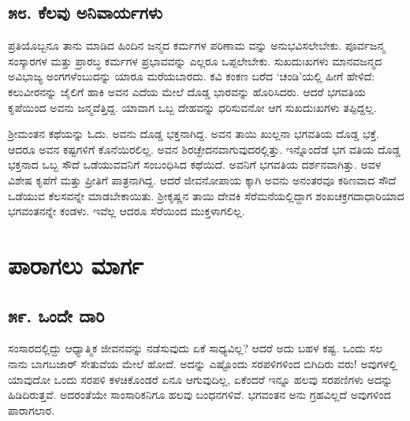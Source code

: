 \section{\num{೫೮.} ಕೆಲವು ಅನಿವಾರ್ಯಗಳು}

ಪ್ರತಿಯೊಬ್ಬನೂ ತಾನು ಮಾಡಿದ ಹಿಂದಿನ ಜನ್ಮದ ಕರ್ಮಗಳ ಪರಿಣಾಮ ವನ್ನು ಅನುಭವಿಸಲೇಬೇಕು. ಪೂರ್ವಜನ್ಮ ಸಂಸ್ಕಾರಗಳ ಮತ್ತು ಪ್ರಾರಬ್ಧ ಕರ್ಮಗಳ ಪ್ರಭಾವವನ್ನು ಎಲ್ಲರೂ ಒಪ್ಪಲೇಬೇಕು. ಸುಖದುಃಖಗಳು ಮಾನವಜನ್ಮದ ಅವಿಭಾಜ್ಯ ಅಂಗಗಳೆಂಬುದನ್ನು ಯಾರೂ ಮರೆಯಬಾರದು. ಕವಿ ಕಂಕಣ ಬರೆದ ‘ಚಂಡಿ’ಯಲ್ಲಿ ಹೀಗೆ ಹೇಳಿದೆ: ಕಲುವೀರನನ್ನು ಜೈಲಿಗೆ ಹಾಕಿ ಅವನ ಎದೆಯ ಮೇಲೆ ದೊಡ್ಡ ಭಾರವನ್ನು ಹೊರಿಸಿದರು. ಆದರೆ ಭಗವತಿಯ ಕೃಪೆಯಿಂದ ಅವನು ಜನ್ಮವೆತ್ತಿದ್ದ. ಯಾವಾಗ ಒಬ್ಬ ದೇಹವನ್ನು ಧರಿಸುವನೋ ಆಗ ಸುಖದುಃಖಗಳು ತಪ್ಪಿದ್ದಲ್ಲ.

ಶ್ರೀಮಂತನ ಕಥೆಯನ್ನು ಓದು. ಅವನು ದೊಡ್ಡ ಭಕ್ತನಾಗಿದ್ದ. ಅವನ ತಾಯಿ ಖುಲ್ಲನಾ ಭಗವತಿಯ ದೊಡ್ಡ ಭಕ್ತೆ. ಆದರೂ ಅವನ ಕಷ್ಟಗಳಿಗೆ ಕೊನೆಯಿರಲಿಲ್ಲ. ಅವನ ಶಿರಚ್ಛೇದನವಾಗುವುದರಲ್ಲಿತ್ತು. ಇನ್ನೊಂದೆಡೆ ಭಗ ವತಿಯ ದೊಡ್ಡ ಭಕ್ತನಾದ ಒಬ್ಬ ಸೌದೆ ಒಡೆಯುವವನಿಗೆ ಸಂಬಂಧಿಸಿದ ಕಥೆಯಿದೆ. ಅವನಿಗೆ ಭಗವತಿಯ ದರ್ಶನವಾಗಿತ್ತು. ಅವಳ ವಿಶೇಷ ಕೃಪೆಗೆ ಮತ್ತು ಪ್ರೀತಿಗೆ ಪಾತ್ರನಾಗಿದ್ದ. ಆದರೆ ಜೀವನೋಪಾಯ ಕ್ಕಾಗಿ ಅವನು ಅನಂತರವೂ ಕಠಿಣವಾದ ಸೌದೆ ಒಡೆಯುವ ಕೆಲಸವನ್ನೇ ಮಾಡಬೇಕಾಯಿತು. ಶ್ರೀಕೃಷ್ಣನ ತಾಯಿ ದೇವಕಿ ಸೆರೆಮನೆಯಲ್ಲಿದ್ದಾಗ ಶಂಖಚಕ್ರಗದಾಧಾರಿಯಾದ ಭಗವಂತನನ್ನೇ ಕಂಡಳು. ಇವೆಲ್ಲ ಆದರೂ ಸೆರೆಯಿಂದ ಮುಕ್ತಳಾಗಲಿಲ್ಲ.

\chapter{ಪಾರಾಗಲು ಮಾರ್ಗ}

\section{\num{೫೯. } ಒಂದೇ ದಾರಿ}

ಸಂಸಾರದಲ್ಲಿದ್ದು ಆಧ್ಯಾತ್ಮಿಕ ಜೀವನವನ್ನು ನಡೆಸುವುದು ಏಕೆ ಸಾಧ್ಯವಿಲ್ಲ? ಆದರೆ ಅದು ಬಹಳ ಕಷ್ಟ. ಒಂದು ಸಲ ನಾನು ಬಾಗಬಜಾರ್ ಸೇತುವೆಯ ಮೇಲೆ ಹೋದೆ. ಅದನ್ನು ಎಷ್ಟೊಂದು ಸರಪಳಿಗಳಿಂದ ಬಿಗಿದಿರು ವರು! ಅವುಗಳಲ್ಲಿ ಯಾವುದೋ ಒಂದು ಸರಪಳಿ ಕಳಚಿಕೊಂಡರೆ ಏನೂ ಆಗುವುದಿಲ್ಲ, ಏಕೆಂದರೆ ಇನ್ನೂ ಹಲವು ಸರಪಣಿಗಳು ಅದನ್ನು ಹಿಡಿದಿರುತ್ತವೆ. ಅದರಂತೆಯೇ ಸಾಂಸಾರಿಕನಿಗೂ ಹಲವು ಬಂಧನಗಳಿವೆ. ಭಗವಂತನ ಅನು ಗ್ರಹವಿಲ್ಲದೆ ಅವುಗಳಿಂದ ಪಾರಾಗಲಾರ.

